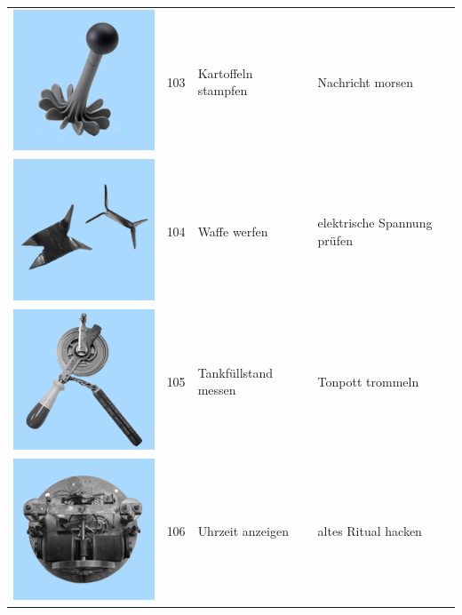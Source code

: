 \documentclass[
  english,
  man,floatsintext]{apa7}
\begin{document}
\begin{center}
\begin{ThreePartTable}
\begin{longtable}{llll}
\includegraphics[valign=c, scale=0.19]{../materials/unfamiliar/103.png} & 103 & Kartoffeln stampfen & Nachricht morsen\\
\includegraphics[valign=c, scale=0.19]{../materials/unfamiliar/104.png} & 104 & Waffe werfen & elektrische Spannung prüfen\\
\includegraphics[valign=c, scale=0.19]{../materials/unfamiliar/105.png} & 105 & Tankfüllstand messen & Tonpott trommeln\\
\includegraphics[valign=c, scale=0.19]{../materials/unfamiliar/106.png} & 106 & Uhrzeit anzeigen & altes Ritual hacken\\

\end{longtable}
\end{ThreePartTable}
\end{center}
\end{document}
